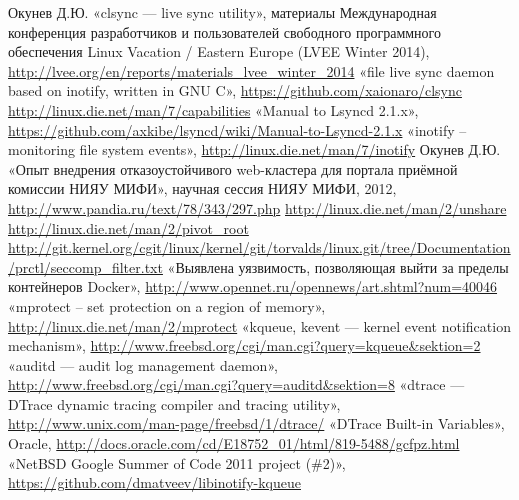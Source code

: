 \documentclass[10pt, a5paper]{article}
\begin{document}
\begin{thebibliography}{9}
   Окунев Д.Ю. «clsync — live sync utility», материалы Международная конференция разработчиков и пользователей свободного программного обеспечения Linux Vacation / Eastern Europe (LVEE Winter 2014), \url{http://lvee.org/en/reports/materials_lvee_winter_2014}
   «file live sync daemon based on inotify, written in GNU C», \url{https://github.com/xaionaro/clsync}
   \url{http://linux.die.net/man/7/capabilities}
   «Manual to Lsyncd 2.1.x», \url{https://github.com/axkibe/lsyncd/wiki/Manual-to-Lsyncd-2.1.x}
   «inotify – monitoring file system events», \url{http://linux.die.net/man/7/inotify}
   Окунев Д.Ю. «Опыт внедрения отказоустойчивого web-кластера для портала приёмной комиссии НИЯУ МИФИ», научная сессия НИЯУ МИФИ, 2012, \url{http://www.pandia.ru/text/78/343/297.php}
   \url{http://linux.die.net/man/2/unshare}
   \url{http://linux.die.net/man/2/pivot_root}
   \url{http://git.kernel.org/cgit/linux/kernel/git/torvalds/linux.git/tree/Documentation/prctl/seccomp_filter.txt}
   «Выявлена уязвимость, позволяющая выйти за пределы контейнеров Docker», \url{http://www.opennet.ru/opennews/art.shtml?num=40046}
   «mprotect -- set protection on a region of memory», \url{http://linux.die.net/man/2/mprotect}
   «kqueue, kevent — kernel event notification mechanism», \url{http://www.freebsd.org/cgi/man.cgi?query=kqueue&sektion=2}
   «auditd — audit log management daemon», \url{http://www.freebsd.org/cgi/man.cgi?query=auditd&sektion=8}
   «dtrace — DTrace dynamic tracing compiler and tracing utility», \url{http://www.unix.com/man-page/freebsd/1/dtrace/}
   «DTrace Built-in Variables», Oracle, \url{http://docs.oracle.com/cd/E18752_01/html/819-5488/gcfpz.html}
   «NetBSD Google Summer of Code 2011 project (\#2)», \url{https://github.com/dmatveev/libinotify-kqueue}
\end{thebibliography}
\end{document}
